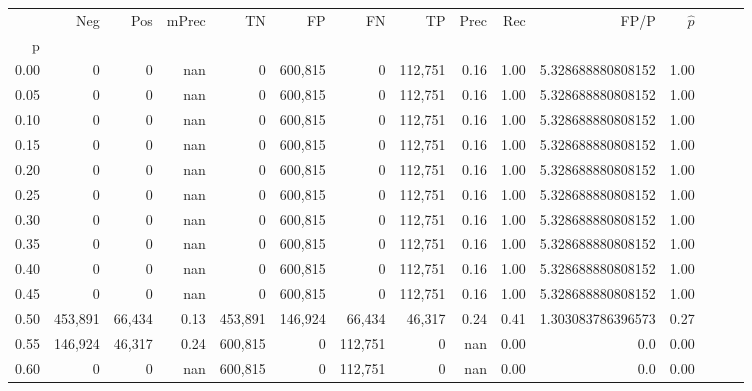 \begin{tabular}{rrrrrrrrrrrrrrr}
\toprule
{} &      Neg &     Pos & mPrec &       TN &       FP &       FN &       TP &  Prec &   Rec &               FP/P & $\hat{p}$ \\
p    &          &         &       &          &          &          &          &       &       &                    &           \\
\midrule
0.00 &        0 &       0 &   nan &        0 &  600,815 &        0 &  112,751 &  0.16 &  1.00 &  5.328688880808152 &      1.00 \\
0.05 &        0 &       0 &   nan &        0 &  600,815 &        0 &  112,751 &  0.16 &  1.00 &  5.328688880808152 &      1.00 \\
0.10 &        0 &       0 &   nan &        0 &  600,815 &        0 &  112,751 &  0.16 &  1.00 &  5.328688880808152 &      1.00 \\
0.15 &        0 &       0 &   nan &        0 &  600,815 &        0 &  112,751 &  0.16 &  1.00 &  5.328688880808152 &      1.00 \\
0.20 &        0 &       0 &   nan &        0 &  600,815 &        0 &  112,751 &  0.16 &  1.00 &  5.328688880808152 &      1.00 \\
0.25 &        0 &       0 &   nan &        0 &  600,815 &        0 &  112,751 &  0.16 &  1.00 &  5.328688880808152 &      1.00 \\
0.30 &        0 &       0 &   nan &        0 &  600,815 &        0 &  112,751 &  0.16 &  1.00 &  5.328688880808152 &      1.00 \\
0.35 &        0 &       0 &   nan &        0 &  600,815 &        0 &  112,751 &  0.16 &  1.00 &  5.328688880808152 &      1.00 \\
0.40 &        0 &       0 &   nan &        0 &  600,815 &        0 &  112,751 &  0.16 &  1.00 &  5.328688880808152 &      1.00 \\
0.45 &        0 &       0 &   nan &        0 &  600,815 &        0 &  112,751 &  0.16 &  1.00 &  5.328688880808152 &      1.00 \\
0.50 &  453,891 &  66,434 &  0.13 &  453,891 &  146,924 &   66,434 &   46,317 &  0.24 &  0.41 &  1.303083786396573 &      0.27 \\
0.55 &  146,924 &  46,317 &  0.24 &  600,815 &        0 &  112,751 &        0 &   nan &  0.00 &                0.0 &      0.00 \\
0.60 &        0 &       0 &   nan &  600,815 &        0 &  112,751 &        0 &   nan &  0.00 &                0.0 &      0.00 \\

\end{tabular}
